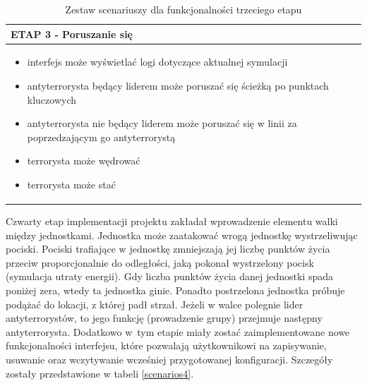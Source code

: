 \begin{table}
\begin{center}
\begin{tabular}{|p{}|}
\hline
ETAP 3 - Poruszanie się\\\hline
	\begin{itemize}
		\setlength\itemsep{0pt}
		\item interfejs może wyświetlać logi dotyczące aktualnej symulacji
		\item antyterrorysta będący liderem może poruszać się ścieżką po punktach kluczowych
		\item antyterrorysta nie będący liderem może poruszać się w linii za poprzedzającym go antyterrorystą
		\item terrorysta może wędrować
		\item terrorysta może stać
	\end{itemize}
\\\hline
\end{tabular}
\caption {Zestaw scenariuszy dla funkcjonalności trzeciego etapu\label{scenarios3}}
\end{center}
\end{table} 

Czwarty etap implementacji projektu zakładał wprowadzenie elementu walki między jednostkami. Jednostka może zaatakować wrogą jednostkę wystrzeliwując pociski. Pociski trafiające w jednostkę zmniejszają jej liczbę punktów życia przeciw proporcjonalnie do odległości, jaką pokonał wystrzelony pocisk (symulacja utraty energii). Gdy liczba punktów życia danej jednostki spada poniżej zera, wtedy ta jednostka ginie. Ponadto postrzelona jednostka próbuje podążać do lokacji, z której padł strzał. Jeżeli w walce polegnie lider antyterrorystów, to jego funkcję (prowadzenie grupy) przejmuje następny antyterrorysta. Dodatkowo w~tym etapie miały zostać zaimplementowane nowe funkcjonalności interfejsu, które pozwalają użytkownikowi na zapisywanie, usuwanie oraz wczytywanie wcześniej przygotowanej konfiguracji. Szczegóły zostały przedstawione w tabeli \ref{scenarios4}.

